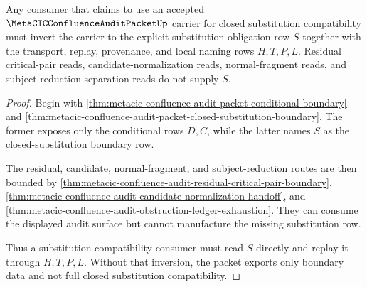 \begin{theorem}
\label{thm:metacic-confluence-audit-substitution-obligation-inversion}
Any consumer that claims to use an accepted $\MetaCICConfluenceAuditPacketUp$ carrier for closed substitution compatibility must invert the carrier to the explicit substitution-obligation row $S$ together with the transport, replay, provenance, and local naming rows $H,T,P,L$. Residual critical-pair reads, candidate-normalization reads, normal-fragment reads, and subject-reduction-separation reads do not supply $S$.
\end{theorem}
\begin{proof}
Begin with \autoref{thm:metacic-confluence-audit-packet-conditional-boundary} and \autoref{thm:metacic-confluence-audit-packet-closed-substitution-boundary}. The former exposes only the conditional rows $D,C$, while the latter names $S$ as the closed-substitution boundary row.

The residual, candidate, normal-fragment, and subject-reduction routes are then bounded by \autoref{thm:metacic-confluence-audit-residual-critical-pair-boundary}, \autoref{thm:metacic-confluence-audit-candidate-normalization-handoff}, and \autoref{thm:metacic-confluence-audit-obstruction-ledger-exhaustion}. They can consume the displayed audit surface but cannot manufacture the missing substitution row.

Thus a substitution-compatibility consumer must read $S$ directly and replay it through $H,T,P,L$. Without that inversion, the packet exports only boundary data and not full closed substitution compatibility.
\end{proof}


